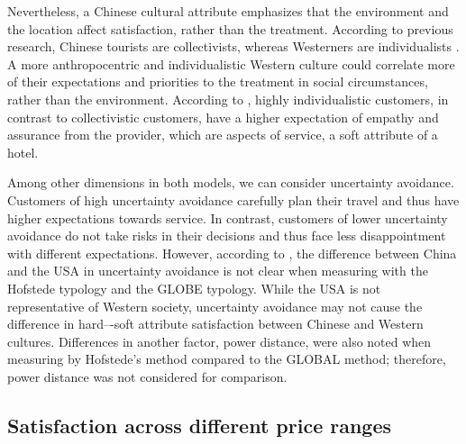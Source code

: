 \documentclass[smallextended,natbib]{svjour3}       %
\begin{document}
    Nevertheless, a Chinese cultural attribute emphasizes that the environment and the location  affect satisfaction, rather than the treatment. According to previous research, Chinese tourists are collectivists, whereas Westerners are individualists \cite[][]{kim2000}. A more anthropocentric and individualistic Western culture could correlate more of their expectations and priorities to the treatment in social circumstances, rather than the environment. According to \cite{donthu1998cultural}, highly individualistic customers, in contrast to collectivistic customers, have a higher expectation of empathy and assurance from the provider, which are aspects of service, a soft attribute of a hotel.

    Among other dimensions in both models, we can consider uncertainty avoidance. Customers of high uncertainty avoidance carefully plan their travel and thus have higher expectations towards service. In contrast, customers of lower uncertainty avoidance do not take risks in their decisions and thus face less disappointment with different expectations. However, according to \cite{xiumei2011cultural}, the difference between China and the USA in uncertainty avoidance is not clear when measuring with the Hofstede typology and the GLOBE typology. While the USA is not representative of Western society, uncertainty avoidance may not cause the difference in hard–-soft attribute satisfaction between Chinese and Western cultures. Differences in another factor, power distance, were also noted when measuring by Hofstede's method compared to the GLOBAL method; therefore, power distance was not considered for comparison.

  \subsection{Satisfaction across different price ranges}\label{disc:price}
\end{document}
